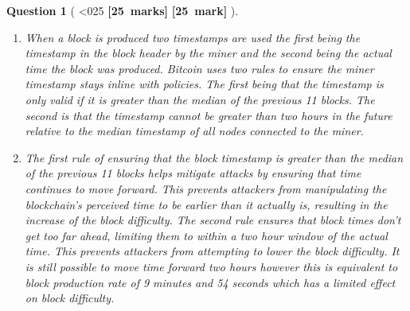 \documentclass[a4paper]{article}
\theoremstyle{que}
\newtheorem{question}{Question}
\newcommand\points[1]{%
\ifnum1<0#1\relax%
    {\bf \small [#1~marks]}%
  \else%
    {\bf \small [#1~mark]}%
  \fi%
}%
\begin{document}
\begin{question}[\points{25}]
\begin{enumerate}[label=(\alph*)]
    \item[(ii)] When a block is produced two timestamps are used the first being the timestamp in the block header by the miner and the second being the actual time the block was produced. Bitcoin uses two rules to ensure the miner timestamp stays inline with policies. The first being that the timestamp is only valid if it is greater than the median of the previous 11 blocks. The second is that the timestamp cannot be greater than two hours in the future relative to the median timestamp of all nodes connected to the miner. \cite{bitcoinwiki_block_timestamp} \cite{bitmex_block_timestamp}
    
    \item[(iii)] The first rule of ensuring that the block timestamp is greater than the median of the previous 11 blocks helps mitigate attacks by ensuring that time continues to move forward. This prevents attackers from manipulating the blockchain's perceived time to be earlier than it actually is, resulting in the increase of the block difficulty. The second rule ensures that block times don't get too far ahead, limiting them to within a two hour window of the actual time. This prevents attackers from attempting to lower the block difficulty. It is still possible to move time forward two hours however this is equivalent to block production rate of 9 minutes and 54 seconds \cite{bitmex_block_timestamp} which has a limited effect on block difficulty.
  \end{enumerate}
\end{question}

\newpage

\end{document}
